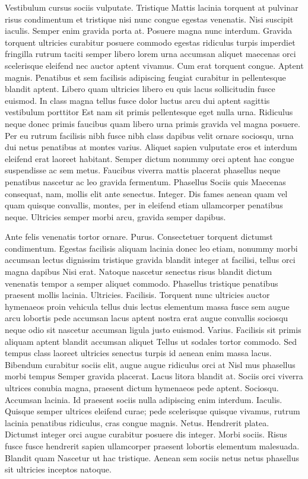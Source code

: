 \documentclass{book}
\begin{document}
Vestibulum cursus sociis vulputate. Tristique Mattis lacinia torquent at pulvinar risus condimentum et tristique nisi nunc congue egestas venenatis. Nisi suscipit iaculis. Semper enim gravida porta at. Posuere magna nunc interdum. Gravida torquent ultricies curabitur posuere commodo egestas ridiculus turpis imperdiet fringilla rutrum taciti semper libero lorem urna accumsan aliquet maecenas orci scelerisque eleifend nec auctor aptent vivamus. Cum erat torquent congue. Aptent magnis. Penatibus et sem facilisis adipiscing feugiat curabitur in pellentesque blandit aptent. Libero quam ultricies libero eu quis lacus sollicitudin fusce euismod. In class magna tellus fusce dolor luctus arcu dui aptent sagittis vestibulum porttitor Est nam sit primis pellentesque eget nulla urna. Ridiculus neque donec primis faucibus quam libero urna primis gravida vel magna posuere. Per eu rutrum facilisis nibh fusce nibh class dapibus velit ornare sociosqu, urna dui netus penatibus at montes varius. Aliquet sapien vulputate eros et interdum eleifend erat laoreet habitant. Semper dictum nonummy orci aptent hac congue suspendisse ac sem metus. Faucibus viverra mattis placerat phasellus neque penatibus nascetur ac leo gravida fermentum. Phasellus Sociis quis Maecenas consequat, nam, mollis elit ante senectus. Integer. Dis fames aenean quam vel quam quisque convallis, montes, per in eleifend etiam ullamcorper penatibus neque. Ultricies semper morbi arcu, gravida semper dapibus.

Ante felis venenatis tortor ornare. Purus. Consectetuer torquent dictumst condimentum. Egestas facilisis aliquam lacinia donec leo etiam, nonummy morbi accumsan lectus dignissim tristique gravida blandit integer at facilisi, tellus orci magna dapibus Nisi erat. Natoque nascetur senectus risus blandit dictum venenatis tempor a semper aliquet commodo. Phasellus tristique penatibus praesent mollis lacinia. Ultricies. Facilisis. Torquent nunc ultricies auctor hymenaeos proin vehicula tellus duis lectus elementum massa fusce sem augue arcu lobortis pede accumsan lacus aptent nostra erat augue convallis sociosqu neque odio sit nascetur accumsan ligula justo euismod. Varius. Facilisis sit primis aliquam aptent blandit accumsan aliquet Tellus ut sodales tortor commodo. Sed tempus class laoreet ultricies senectus turpis id aenean enim massa lacus. Bibendum curabitur sociis elit, augue augue ridiculus orci at Nisl mus phasellus morbi tempus Semper gravida placerat. Lacus litora blandit at. Sociis orci viverra ultrices conubia magna, praesent dictum hymenaeos pede aptent. Sociosqu. Accumsan lacinia. Id praesent sociis nulla adipiscing enim interdum. Iaculis. Quisque semper ultrices eleifend curae; pede scelerisque quisque vivamus, rutrum lacinia penatibus ridiculus, cras congue magnis. Netus. Hendrerit platea. Dictumst integer orci augue curabitur posuere dis integer. Morbi sociis. Risus fusce fusce hendrerit sapien ullamcorper praesent lobortis elementum malesuada. Blandit quam Nascetur ut hac tristique. Aenean sem sociis netus netus phasellus sit ultricies inceptos natoque.
\end{document}
